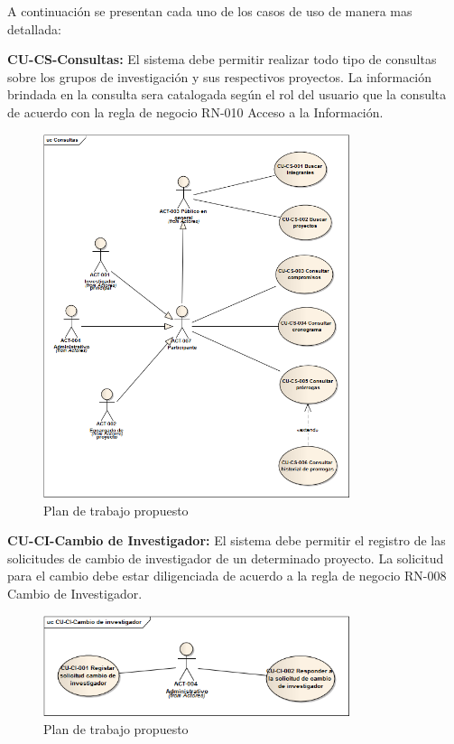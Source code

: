 \documentclass[12pt,oneside,letterpaper]{report}
\begin{document}
\maketitle A continuación se presentan cada uno de los casos de uso de manera mas detallada:

\textbf{CU-CS-Consultas:}
El sistema debe permitir realizar todo tipo de consultas sobre los grupos de investigación y sus respectivos proyectos. La información brindada en la consulta sera catalogada según el rol del usuario que la consulta de acuerdo con la regla de negocio RN-010 Acceso a la Información.

\begin{figure}[h!]
  \centering
    \includegraphics[width=0.80\textwidth]{./img/img2.bmp}
  \caption{Plan de trabajo propuesto}
\end{figure}

\textbf{CU-CI-Cambio de Investigador:}
El sistema debe permitir el registro de las solicitudes de cambio de investigador de un determinado proyecto. La solicitud para el cambio debe estar diligenciada de acuerdo a la regla de negocio RN-008 Cambio de Investigador.

\begin{figure}[h!]
  \centering
    \includegraphics[width=0.80\textwidth]{./img/img3.bmp}
  \caption{Plan de trabajo propuesto}
\end{figure}
\end{document}
